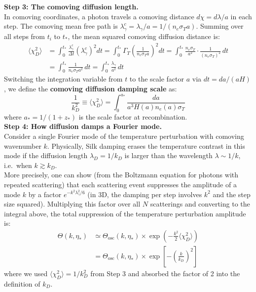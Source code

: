 \begin{foundation}
    \textbf{Step 3: The comoving diffusion length.} \\
    In comoving coordinates, a photon travels a comoving distance $d\chi = d\lambda / a$ in each step. The comoving mean free path is $\lambda_\gamma^c = \lambda_\gamma / a = 1/(n_e \sigma_T a)$. Summing over all steps from $t_i$ to $t_*$, the mean squared comoving diffusion distance is:
    \begin{align*}
        \langle \chi_D^2 \rangle &= \int_0^{t_*} \frac{\lambda_\gamma^c}{\Delta t} \left(\lambda_\gamma^c\right)^2 dt 
        = \int_0^{t_*} \Gamma_T \left(\frac{1}{n_e \sigma_T a}\right)^2 dt 
        = \int_0^{t_*} \frac{n_e \sigma_T}{a^2} \cdot \frac{1}{(n_e \sigma_T)^2} \, dt \\
        &= \int_0^{t_*} \frac{1}{n_e \sigma_T a^2} \, dt 
        = \int_0^{t_*} \frac{\lambda_\gamma}{a^2} \, dt
    \end{align*}
    Switching the integration variable from $t$ to the scale factor $a$ via $dt = da / (a H)$, we define the \textbf{comoving diffusion damping scale} as:
    \[
        \frac{1}{k_D^2} \equiv \langle \chi_D^2 \rangle = \int_0^{a_*} \frac{da}{a^3 H(a) n_e(a) \sigma_T}
    \]
    where $a_* = 1/(1+z_*)$ is the scale factor at recombination. \\

    \textbf{Step 4: How diffusion damps a Fourier mode.} \\
    Consider a single Fourier mode of the temperature perturbation with comoving wavenumber $k$. Physically, Silk damping erases the temperature contrast in this mode if the diffusion length $\lambda_D = 1/k_D$ is larger than the wavelength $\lambda \sim 1/k$, i.e.\ when $k \gtrsim k_D$. \\

    More precisely, one can show (from the Boltzmann equation for photons with repeated scattering) that each scattering event suppresses the amplitude of a mode $k$ by a factor $e^{-k^2 \lambda_\gamma^2 / 6}$ (in 3D, the damping per step involves $k^2$ and the step size squared). Multiplying this factor over all $N$ scatterings and converting to the integral above, the total suppression of the temperature perturbation amplitude is:
    \begin{align*}
        \Theta(k, \eta_*) &\simeq \Theta_{\mathrm{osc}}(k, \eta_*) \times \exp\!\left( -\frac{k^2}{2} \langle \chi_D^2 \rangle \right) \\
        &= \Theta_{\mathrm{osc}}(k, \eta_*) \times \exp\!\left[ -\left(\frac{k}{k_D}\right)^2 \right]
    \end{align*}
    where we used $\langle \chi_D^2 \rangle = 1/k_D^2$ from Step 3 and absorbed the factor of 2 into the definition of $k_D$. \\


\end{foundation}
